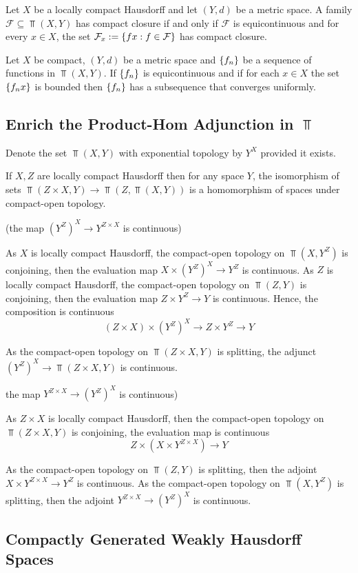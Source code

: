 \documentclass{article}
\begin{document}
\begin{theorem}
    Let $X$ be a locally compact Hausdorff and let $(Y, d)$ be a metric space. A family $\mathcal{F} \subseteq \Top(X, Y)$ has compact closure if and only if $\mathcal{F}$ is equicontinuous and for every $x \in X$, the set $\mathcal{F}_x := \{fx: f \in \mathcal{F}\}$ has compact closure.
\end{theorem}

\begin{theorem}
    Let $X$ be compact, $(Y, d)$ be a metric space and $\{f_n\}$ be a sequence of functions in $\Top(X, Y)$. If $\{f_n\}$ is equicontinuous and if for each $x \in X$ the set $\{f_n x\}$ is bounded then $\{f_n\}$ has a subsequence that converges uniformly.
\end{theorem}

\subsection{Enrich the Product-Hom Adjunction in $\Top$}

\begin{definition}
    Denote the set $\Top(X, Y)$ with exponential topology by $Y^X$ provided it exists.
\end{definition}

\begin{theorem}
    If $X, Z$ are locally compact Hausdorff then for any space $Y$, the isomorphism of sets $\Top(Z \times X, Y) \to \Top(Z, \Top(X, Y))$ is a homomorphism of spaces under compact-open topology.
\end{theorem}

\begin{longproof}
    (the map $(Y^Z)^X \to Y^{Z \times X}$ is continuous)

    As $X$ is locally compact Hausdorff, the compact-open topology on $\Top(X, Y^Z)$ is conjoining, then the evaluation map $X \times (Y^Z)^X \to Y^Z$ is continuous. As $Z$ is locally compact Hausdorff, the compact-open topology on $\Top(Z, Y)$ is conjoining, then the evaluation map $Z \times Y^Z \to Y$ is continuous. Hence, the composition is continuous
    $$
        (Z \times X) \times (Y^Z)^X \to Z \times Y^Z \to Y
    $$

    As the compact-open topology on $\Top(Z \times X, Y)$ is splitting, the adjunct $(Y^Z)^X \to \Top(Z \times X, Y)$ is continuous.

    the map $Y^{Z \times X} \to (Y^Z)^X$ is continuous)

    As $Z \times X$ is locally compact Hausdorff, then the compact-open topology on $\Top(Z \times X, Y)$ is conjoining, the evaluation map is continuous
    $$
        Z \times (X \times Y^{Z \times X}) \to Y
    $$

    As the compact-open topology on $\Top(Z, Y)$ is splitting, then the adjoint $X \times Y^{Z \times X} \to Y^Z$ is continuous. As the compact-open topology on $\Top(X, Y^Z)$ is splitting, then the adjoint $Y^{Z \times X} \to (Y^Z)^X$ is continuous.
\end{longproof}



\subsection{Compactly Generated Weakly Hausdorff Spaces}

\end{document}
